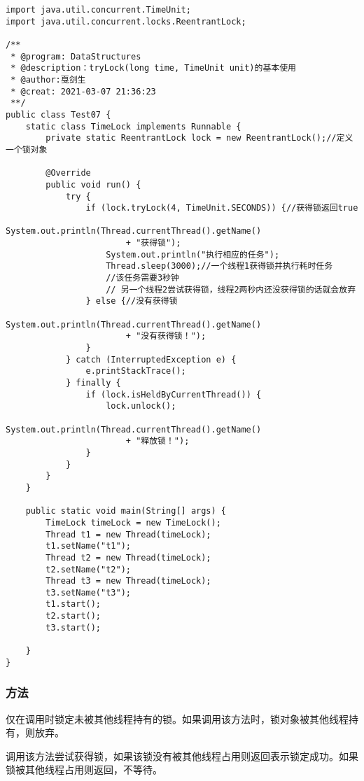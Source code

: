 \documentclass[a4paper]{report}
\begin{document}
\begin{Verbatim}[frame=single,numbersep=5pt,xleftmargin=1.5em,xrightmargin=1.5em]
import java.util.concurrent.TimeUnit;
import java.util.concurrent.locks.ReentrantLock;

/**
 * @program: DataStructures
 * @description：tryLock(long time, TimeUnit unit)的基本使用
 * @author:戛剑生
 * @creat: 2021-03-07 21:36:23
 **/
public class Test07 {
    static class TimeLock implements Runnable {
        private static ReentrantLock lock = new ReentrantLock();//定义一个锁对象

        @Override
        public void run() {
            try {
                if (lock.tryLock(4, TimeUnit.SECONDS)) {//获得锁返回true
                    System.out.println(Thread.currentThread().getName()
                        + "获得锁");
                    System.out.println("执行相应的任务");
                    Thread.sleep(3000);//一个线程1获得锁并执行耗时任务
                    //该任务需要3秒钟
                    // 另一个线程2尝试获得锁，线程2两秒内还没获得锁的话就会放弃
                } else {//没有获得锁
                    System.out.println(Thread.currentThread().getName()
                        + "没有获得锁！");
                }
            } catch (InterruptedException e) {
                e.printStackTrace();
            } finally {
                if (lock.isHeldByCurrentThread()) {
                    lock.unlock();
                    System.out.println(Thread.currentThread().getName()
                        + "释放锁！");
                }
            }
        }
    }

    public static void main(String[] args) {
        TimeLock timeLock = new TimeLock();
        Thread t1 = new Thread(timeLock);
        t1.setName("t1");
        Thread t2 = new Thread(timeLock);
        t2.setName("t2");
        Thread t3 = new Thread(timeLock);
        t3.setName("t3");
        t1.start();
        t2.start();
        t3.start();

    }
}\end{Verbatim}
\subsubsection{方法}
仅在调用时锁定未被其他线程持有的锁。如果调用该方法时，锁对象被其他线程持有，则放弃。

调用该方法尝试获得锁，如果该锁没有被其他线程占用则返回表示锁定成功。如果锁被其他线程占用则返回，不等待。
\end{document}
